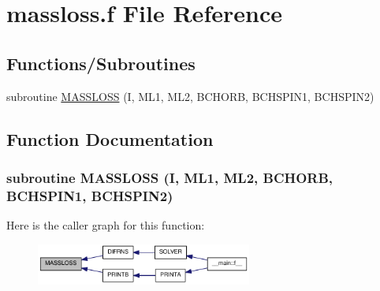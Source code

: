 \hypertarget{massloss_8f}{
\section{massloss.f File Reference}
\label{massloss_8f}
}
\subsection*{Functions/Subroutines}
\begin{DoxyCompactItemize}
\item 
subroutine \hyperlink{massloss_8f_a96d5338a48edc8d7769a5471a9105268}{MASSLOSS} (I, ML1, ML2, BCHORB, BCHSPIN1, BCHSPIN2)
\end{DoxyCompactItemize}


\subsection{Function Documentation}
\hypertarget{massloss_8f_a96d5338a48edc8d7769a5471a9105268}{
\subsubsection[{MASSLOSS}]{\setlength{\rightskip}{0pt plus 5cm}subroutine MASSLOSS (I, \/  ML1, \/  ML2, \/  BCHORB, \/  BCHSPIN1, \/  BCHSPIN2)}}
\label{massloss_8f_a96d5338a48edc8d7769a5471a9105268}


Here is the caller graph for this function:\nopagebreak
\begin{figure}[H]
\begin{center}
\leavevmode
\includegraphics[width=201pt]{massloss_8f_a96d5338a48edc8d7769a5471a9105268_icgraph}
\end{center}
\end{figure}
